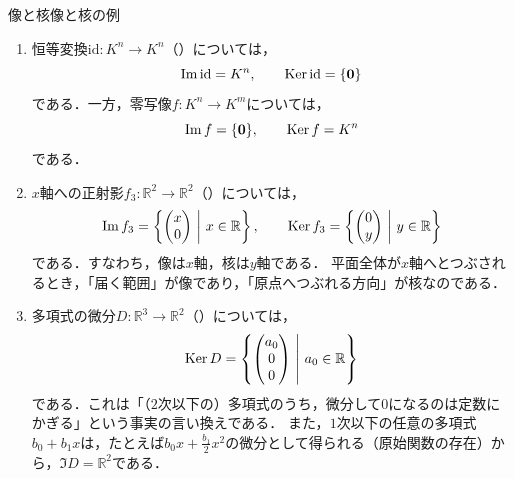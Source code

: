 \begin{example}{像と核}{像と核の例}
  \begin{enumerate}[label=(\arabic*),leftmargin=3.2em]
    \item 恒等変換$\mathrm{id} \colon K^n \to K^n$（）については，
      \[
        \operatorname{Im} \mathrm{id} = K^n, \qquad \operatorname{Ker} \mathrm{id} = \{\bm{0}\}
      \]
      である．一方，零写像$f \colon K^n \to K^m$については，
      \[
        \operatorname{Im} f = \{\bm{0}\}, \qquad \operatorname{Ker} f = K^n
      \]
      である．
    \item $x$軸への正射影$f_3 \colon \mathbb{R}^2 \to \mathbb{R}^2$（）については，
      \[
        \operatorname{Im} f_3 = \left\{ \begin{pmatrix} x \\ 0 \end{pmatrix} ~\middle|~ x \in \mathbb{R} \right\}, \qquad
        \operatorname{Ker} f_3 = \left\{ \begin{pmatrix} 0 \\ y \end{pmatrix} ~\middle|~ y \in \mathbb{R} \right\}
      \]
      である．すなわち，像は$x$軸，核は$y$軸である．
      平面全体が$x$軸へとつぶされるとき，「届く範囲」が像であり，「原点へつぶれる方向」が核なのである．
    \item 多項式の微分$D \colon \mathbb{R}^3 \to \mathbb{R}^2$（）については，
      \[
        \operatorname{Ker} D = \left\{ \begin{pmatrix} a_0 \\ 0 \\ 0 \end{pmatrix} ~\middle|~ a_0 \in \mathbb{R} \right\}
      \]
      である．これは「（$2$次以下の）多項式のうち，微分して$0$になるのは定数にかぎる」という事実の言い換えである．
      また，$1$次以下の任意の多項式$b_0 + b_1 x$は，たとえば$b_0 x + \frac{b_1}{2} x^2$の微分として得られる（原始関数の存在）から，$\Im D = \mathbb{R}^2$である．
  \end{enumerate}
\end{example}

